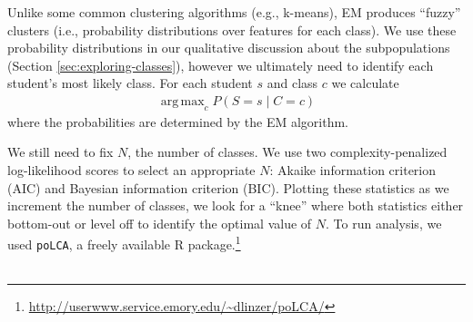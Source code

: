 \documentclass{edm_template}
\DeclareMathOperator*{\argmax}{arg\,max}
\begin{document}

Unlike some common clustering algorithms (e.g., k-means), EM produces ``fuzzy'' clusters (i.e., probability distributions over features for each class). We use these probability distributions in our qualitative discussion about the subpopulations (Section \ref{sec:exploring-classes}), however we ultimately need to identify each student's most likely class. For each student $s$ and class $c$ we calculate
\begin{align}
\argmax_{c} P(S = s \;|\; C = c)
\label{eqn:LCA-argmax}
\end{align}
where the probabilities are determined by the EM algorithm.

We still need to fix $N$, the number of classes. We use two complexity-penalized log-likelihood scores to select an appropriate $N$: Akaike information criterion (AIC) and Bayesian information criterion (BIC). Plotting these statistics as we increment the number of classes, we look for a ``knee'' where both statistics either bottom-out or level off to identify the optimal value of $N$. To run analysis, we used \texttt{poLCA}, a freely available R package.\footnote{\url{http://userwww.service.emory.edu/~dlinzer/poLCA/}}
\\\\
\end{document}
